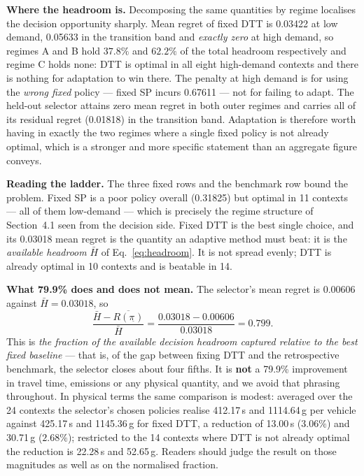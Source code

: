 \documentclass[10pt,a4paper]{article}
\begin{document}
\textbf{Where the headroom is.} Decomposing the same quantities by regime localises the decision opportunity sharply. Mean regret of fixed DTT is 0.03422 at low demand, 0.05633 in the transition band and \emph{exactly zero} at high demand, so regimes A and B hold $37.8\%$ and $62.2\%$ of the total headroom respectively and regime C holds none: DTT is optimal in all eight high-demand contexts and there is nothing for adaptation to win there. The penalty at high demand is for using the \emph{wrong fixed} policy --- fixed SP incurs 0.67611 --- not for failing to adapt. The held-out selector attains zero mean regret in both outer regimes and carries all of its residual regret (0.01818) in the transition band. Adaptation is therefore worth having in exactly the two regimes where a single fixed policy is not already optimal, which is a stronger and more specific statement than an aggregate figure conveys.

\textbf{Reading the ladder.} The three fixed rows and the benchmark row bound the problem. Fixed SP is a poor policy overall (0.31825) but optimal in 11 contexts --- all of them low-demand --- which is precisely the regime structure of Section~4.1 seen from the decision side. Fixed DTT is the best single choice, and its 0.03018 mean regret is the quantity an adaptive method must beat: it is the \emph{available headroom} $\bar H$ of Eq.~\eqref{eq:headroom}. It is not spread evenly; DTT is already optimal in 10 contexts and is beatable in 14.

\textbf{What 79.9\% does and does not mean.} The selector's mean regret is 0.00606 against $\bar H=0.03018$, so
\[
\frac{\bar H-\overline{R(\pi_{\widehat{}})}}{\bar H}=\frac{0.03018-0.00606}{0.03018}=0.799 .
\]
This is \emph{the fraction of the available decision headroom captured relative to the best fixed baseline} --- that is, of the gap between fixing DTT and the retrospective benchmark, the selector closes about four fifths. It is \textbf{not} a 79.9\% improvement in travel time, emissions or any physical quantity, and we avoid that phrasing throughout. In physical terms the same comparison is modest: averaged over the 24 contexts the selector's chosen policies realise 412.17\,s and 1114.64\,g per vehicle against 425.17\,s and 1145.36\,g for fixed DTT, a reduction of 13.00\,s ($3.06\%$) and 30.71\,g ($2.68\%$); restricted to the 14 contexts where DTT is not already optimal the reduction is 22.28\,s and 52.65\,g. Readers should judge the result on those magnitudes as well as on the normalised fraction.
\end{document}
